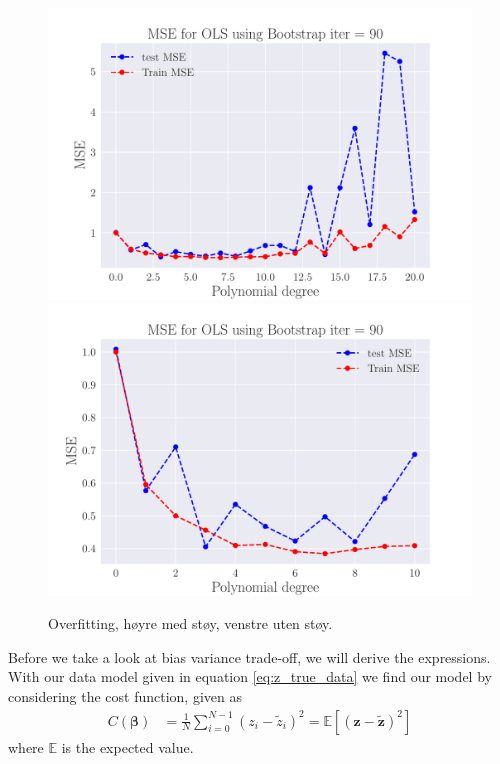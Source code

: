 \documentclass[reprint,english,notitlepage,aps,nobalancelastpage,nofootinbib]{revtex4-1}  %
\begin{document}
\begin{figure}[H]
	\includegraphics[width=\linewidth]{MSE_OLS_n30_eps02_pol20_Bootstrap_re90.pdf}
	\endminipage\hfill
	\includegraphics[width=\linewidth]{MSE_OLS_n30_eps02_pol10_Bootstrap_re90.pdf}
	\endminipage
	\caption{Overfitting, høyre med støy, venstre uten støy.}\label{fig:OLS_overfitting}
\end{figure}

Before we take a look at bias variance trade-off, we will derive the expressions. With our data model given in equation \eqref{eq:z_true_data} we find our model by considering the cost function, given as
\begin{align*}
  C(\bm{\beta}) &= \frac{1}{N} \sum_{i=0}^{N-1} (z_i - \tilde{z}_i)^2 = \mathbb{E}[(\mathbf{z}-\mathbf{\tilde{z}})^2]
\end{align*}
where $\mathbb{E}$ is the expected value. %
\end{document}
